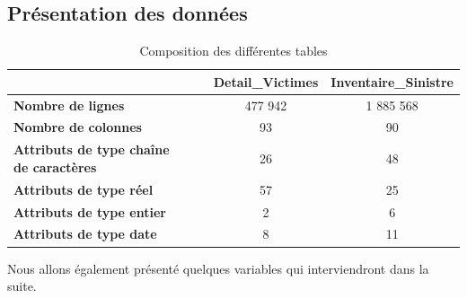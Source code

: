 \subsection{Pr\'esentation des donn\'ees}
\begin{table}[H]
\caption{Composition des diff\'erentes tables}
{\footnotesize
\begin{center}
\begin{tabular}{llcc}
\toprule 
&& \textbf{Detail\_Victimes} & \textbf{Inventaire\_Sinistre} \\
\midrule
\textbf{Nombre de lignes} && 477 942 & 1 885 568 \\ 
\textbf{Nombre de colonnes} && 93 & 90 \\
\textbf{Attributs de type chaîne de caract\`eres} && 26 & 48 \\
\textbf{Attributs de type r\'eel} && 57 & 25 \\
\textbf{Attributs de type entier} && 2 & 6 \\
\textbf{Attributs de type date} && 8 & 11 \\
\bottomrule
\end{tabular}
\end{center}}
\end{table}

Nous allons \'egalement pr\'esent\'e quelques variables qui interviendront dans la suite.

